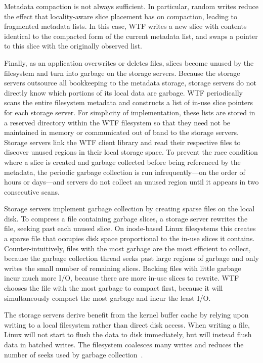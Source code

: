 \documentclass[twocolumn,10pt,letterpaper]{article}
\begin{document}
Metadata compaction is not always sufficient. In particular,
random writes reduce the effect that locality-aware slice placement has on
compaction, leading to fragmented metadata lists.  In this case, WTF writes a
new slice with contents identical to the compacted form of the current metadata
list, and swaps a pointer to this slice with the originally observed list.

Finally, as an application overwrites or deletes files, slices become unused by the
filesystem and turn into garbage on the storage servers.  Because the storage
servers outsource all bookkeeping to the metadata storage, storage servers do
not directly know which portions of its local data are garbage.  WTF
periodically scans the entire filesystem metadata and constructs a list of
in-use slice pointers for each storage server.  For simplicity of
implementation, these lists are stored in a reserved directory within the WTF
filesystem so that they need not be maintained in memory or communicated out of
band to the storage servers.  Storage servers link the WTF client library and
read their respective files to discover unused regions in their local storage
space.  To prevent the race condition where a slice is created and garbage
collected before being referenced by the metadata, the periodic garbage
collection is run infrequently---on the order of hours or days---and servers do
not collect an unused region until it appears in two consecutive scans.

Storage servers implement garbage collection by creating sparse files on the
local disk.  To compress a file containing garbage slices, a storage server
rewrites the file, seeking past each unused slice.  On inode-based Linux
filesystems this creates a sparse file that occupies disk space proportional to
the in-use slices it contains.  Counter-intuitively, files with the most garbage
are the most efficient to collect, because the garbage collection thread seeks
past large regions of garbage and only writes the small number of remaining
slices.  Backing files with little garbage incur much more I/O, because there are more
in-use slices to rewrite.  WTF chooses the file with the most garbage to compact
first, because it will simultaneously compact the most garbage and incur the
least I/O. 

The storage servers derive benefit from the kernel buffer cache by relying upon
writing to a local filesystem rather than direct disk access. When writing a
file, Linux will not start to flush the data to disk immediately, but will
instead flush data in batched writes.  The filesystem coalesces many writes and
reduces the number of seeks used by garbage collection~\cite{ext4}.
\end{document}
